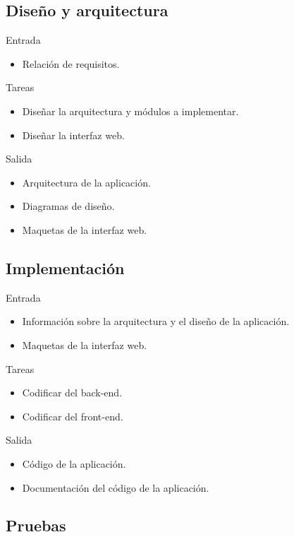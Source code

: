 \subsection*{Diseño y arquitectura\label{ssec:dp:disenho}}

Entrada
\begin{itemize}[leftmargin=3.5em]
  \item Relación de requisitos.
\end{itemize}

Tareas
\begin{itemize}[leftmargin=3.5em]
  \item Diseñar la arquitectura y módulos a implementar. 
  \item Diseñar la interfaz web.
\end{itemize}

Salida
\begin{itemize}[leftmargin=3.5em]
  \item Arquitectura de la aplicación.
  \item Diagramas de diseño.
  \item Maquetas de la interfaz web.
\end{itemize}

\subsection*{Implementación\label{ssec:dp:implementacion}}

Entrada
\begin{itemize}[leftmargin=3.5em]
  \item Información sobre la arquitectura y el diseño de la aplicación.
  \item Maquetas de la interfaz web.
\end{itemize}

Tareas
\begin{itemize}[leftmargin=3.5em]
  \item Codificar del \gls{back-end}.
  \item Codificar del \gls{front-end}.
\end{itemize}

Salida
\begin{itemize}[leftmargin=3.5em]
  \item Código de la aplicación.
  \item Documentación del código de la aplicación.
\end{itemize}

\subsection*{Pruebas\label{ssec:dp:pruebas}}

